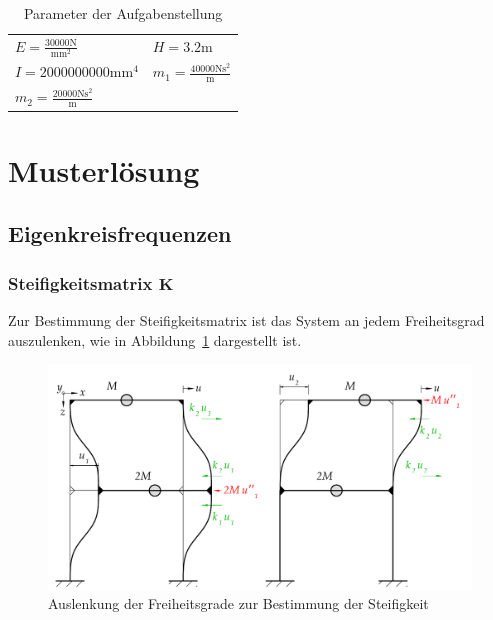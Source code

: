 \documentclass[
  letterpaper,
  DIV=11]{scrreprt}
\begin{document}
\hypertarget{tbl-parameter_mms2}{}
\begin{longtable}[]{@{}
  >{\raggedright\arraybackslash}p{}
  >{\raggedright\arraybackslash}p{}@{}}
\caption{\label{tbl-parameter_mms2}Parameter der
Aufgabenstellung}\tabularnewline
\toprule\noalign{}
\endfirsthead
\endhead
\bottomrule\noalign{}
\endlastfoot
\(E = \frac{30000 \text{N}}{\text{mm}^{2}}\) & \(H = 3.2 \text{m}\) \\
\(I = 2000000000 \text{mm}^{4}\) &
\(m_{1} = \frac{40000 \text{N} \text{s}^{2}}{\text{m}}\) \\
\(m_{2} = \frac{20000 \text{N} \text{s}^{2}}{\text{m}}\) & \\
\end{longtable}

\newpage{}

\hypertarget{sec-mms_steif_ML}{%
\section{Musterlösung}\label{sec-mms_steif_ML}}

\hypertarget{eigenkreisfrequenzen}{%
\subsection{Eigenkreisfrequenzen}\label{eigenkreisfrequenzen}}

\hypertarget{sec-mms_steif_kmatrix}{%
\subsubsection{\texorpdfstring{Steifigkeitsmatrix
\(\mathbf{K}\)}{Steifigkeitsmatrix \textbackslash mathbf\{K\}}}\label{sec-mms_steif_kmatrix}}

Zur Bestimmung der Steifigkeitsmatrix ist das System an jedem
Freiheitsgrad auszulenken, wie in
Abbildung~\ref{fig-mms_steif_steifigkeit} dargestellt ist.

\begin{figure}[H]

{\centering \includegraphics{index_files/mediabag/bilder/aufgabe_mms_steif_auslenk.pdf}

}

\caption{\label{fig-mms_steif_steifigkeit}Auslenkung der Freiheitsgrade
zur Bestimmung der Steifigkeit}

\end{figure}
\end{document}
